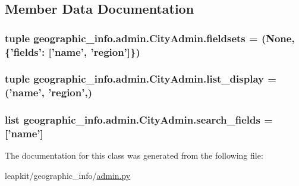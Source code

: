 \subsection{Member Data Documentation}
\hypertarget{classgeographic__info_1_1admin_1_1_city_admin_a668f77bd45d98e780aa452b11956245e}{
\subsubsection[{fieldsets}]{\setlength{\rightskip}{0pt plus 5cm}tuple geographic\-\_\-info.\-admin.\-City\-Admin.\-fieldsets = (None, \{'fields'\-: \mbox{[}'name', 'region'\mbox{]}\})\hspace{0.3cm}{\ttfamily [static]}}}\label{classgeographic__info_1_1admin_1_1_city_admin_a668f77bd45d98e780aa452b11956245e}
\hypertarget{classgeographic__info_1_1admin_1_1_city_admin_aa215029b4541eb0453beca4c746929c5}{
\subsubsection[{list\-\_\-display}]{\setlength{\rightskip}{0pt plus 5cm}tuple geographic\-\_\-info.\-admin.\-City\-Admin.\-list\-\_\-display = ('name', 'region',)\hspace{0.3cm}{\ttfamily [static]}}}\label{classgeographic__info_1_1admin_1_1_city_admin_aa215029b4541eb0453beca4c746929c5}
\hypertarget{classgeographic__info_1_1admin_1_1_city_admin_a1119d364f8da70f4c2540a8868ad492b}{
\subsubsection[{search\-\_\-fields}]{\setlength{\rightskip}{0pt plus 5cm}list geographic\-\_\-info.\-admin.\-City\-Admin.\-search\-\_\-fields = \mbox{[}'name'\mbox{]}\hspace{0.3cm}{\ttfamily [static]}}}\label{classgeographic__info_1_1admin_1_1_city_admin_a1119d364f8da70f4c2540a8868ad492b}


The documentation for this class was generated from the following file\-:\begin{DoxyCompactItemize}
\item 
leapkit/geographic\-\_\-info/\hyperlink{geographic__info_2admin_8py}{admin.\-py}\end{DoxyCompactItemize}
